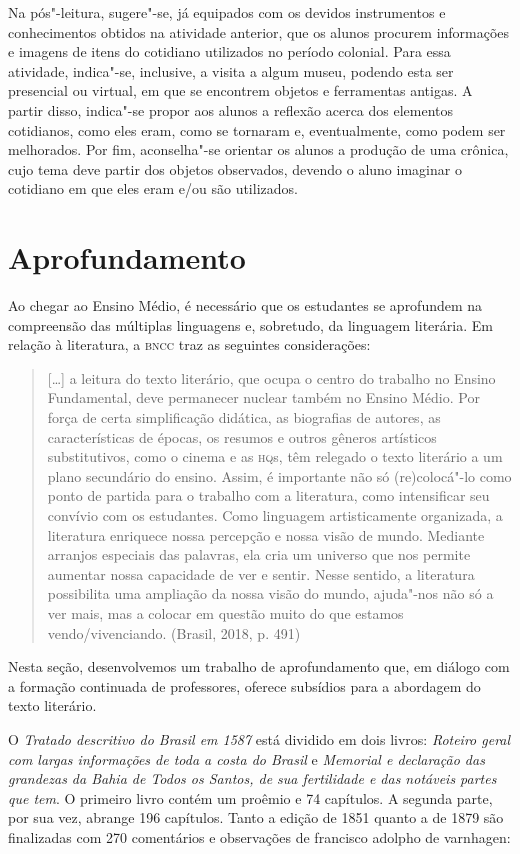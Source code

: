 \documentclass[12pt]{extarticle}
\begin{document}
Na pós"-leitura, sugere"-se, já equipados com os devidos
instrumentos e conhecimentos obtidos na atividade anterior, que os
alunos procurem informações e imagens de itens do cotidiano utilizados
no período colonial. Para essa atividade, indica"-se, inclusive, a visita
a algum museu, podendo esta ser presencial ou virtual, em que se
encontrem objetos e ferramentas antigas. A partir disso, indica"-se
propor aos alunos a reflexão acerca dos elementos cotidianos, como eles
eram, como se tornaram e, eventualmente, como podem ser melhorados. Por
fim, aconselha"-se orientar os alunos a produção de uma crônica, cujo
tema deve partir dos objetos observados, devendo o aluno imaginar o
cotidiano em que eles eram e/ou são utilizados.

\section{Aprofundamento}

Ao chegar ao Ensino Médio, é necessário que os estudantes se aprofundem
na compreensão das múltiplas linguagens e, sobretudo, da linguagem
literária. Em relação à literatura, a \textsc{bncc} traz as seguintes
considerações:

\begin{quote}
{[}\ldots{}{]} a leitura do texto literário, que ocupa o centro do trabalho
no Ensino Fundamental, deve permanecer nuclear também no Ensino Médio.
Por força de certa simplificação didática, as biografias de autores, as
características de épocas, os resumos e outros gêneros artísticos
substitutivos, como o cinema e as \textsc{hq}s, têm relegado o texto literário a
um plano secundário do ensino. Assim, é importante não só (re)colocá"-lo
como ponto de partida para o trabalho com a literatura, como
intensificar seu convívio com os estudantes. Como linguagem
artisticamente organizada, a literatura enriquece nossa percepção e
nossa visão de mundo. Mediante arranjos especiais das palavras, ela cria
um universo que nos permite aumentar nossa capacidade de ver e sentir.
Nesse sentido, a literatura possibilita uma ampliação da nossa visão do
mundo, ajuda"-nos não só a ver mais, mas a colocar em questão muito do
que estamos vendo/vivenciando. (Brasil, 2018, p. 491)
\end{quote}

Nesta seção, desenvolvemos um trabalho de aprofundamento que, em diálogo
com a formação continuada de professores, oferece subsídios para a
abordagem do texto literário.

O \textit{Tratado descritivo do Brasil em 1587} está dividido em dois livros:
\textit{Roteiro geral com largas informações de toda a costa do Brasil} e
\textit{Memorial e declaração das grandezas da Bahia de Todos os Santos, de sua
fertilidade e das notáveis partes que tem}. O primeiro livro contém um
proêmio e 74 capítulos. A segunda parte, por sua vez, abrange 196
capítulos. Tanto a edição de 1851 quanto a de 1879 são finalizadas com
270 comentários e observações de francisco adolpho de varnhagen:
\end{document}
